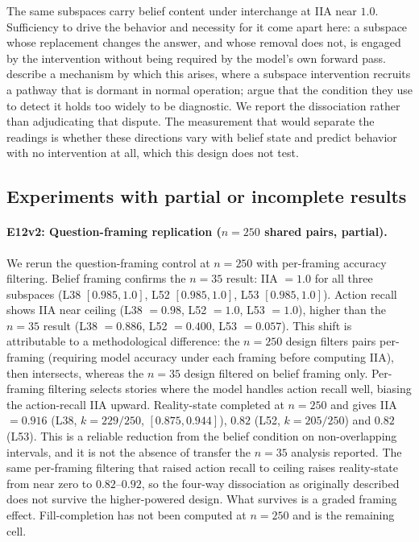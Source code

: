 \documentclass{article}
\begin{document}
The same subspaces carry belief content under interchange at IIA near $1.0$. Sufficiency to
drive the behavior and necessity for it come apart here: a subspace whose replacement changes
the answer, and whose removal does not, is engaged by the intervention without being required
by the model's own forward pass. \citet{makelov2024illusion} describe a mechanism by which
this arises, where a subspace intervention recruits a pathway that is dormant in normal
operation; \citet{wu2024replyillusion} argue that the condition they use to detect it holds
too widely to be diagnostic. We report the dissociation rather than adjudicating that
dispute. The measurement that would separate the readings is whether these directions vary
with belief state and predict behavior with no intervention at all, which this design does
not test.

\subsection{Experiments with partial or incomplete results}

\paragraph{E12v2: Question-framing replication ($n = 250$ shared pairs, partial).}
We rerun the question-framing control at $n = 250$ with per-framing accuracy filtering. Belief framing confirms the $n = 35$ result: IIA $= 1.0$ for all three subspaces (L38 $[0.985, 1.0]$, L52 $[0.985, 1.0]$, L53 $[0.985, 1.0]$). Action recall shows IIA near ceiling (L38 $= 0.98$, L52 $= 1.0$, L53 $= 1.0$), higher than the $n = 35$ result (L38 $= 0.886$, L52 $= 0.400$, L53 $= 0.057$). This shift is attributable to a methodological difference: the $n = 250$ design filters pairs per-framing (requiring model accuracy under each framing before computing IIA), then intersects, whereas the $n = 35$ design filtered on belief framing only. Per-framing filtering selects stories where the model handles action recall well, biasing the action-recall IIA upward. Reality-state completed at $n = 250$ and gives IIA $= 0.916$ (L38, $k = 229/250$, $[0.875, 0.944]$), $0.82$ (L52, $k = 205/250$) and $0.82$ (L53). This is a reliable reduction from the belief condition on non-overlapping intervals, and it is not the absence of transfer the $n = 35$ analysis reported. The same per-framing filtering that raised action recall to ceiling raises reality-state from near zero to $0.82$--$0.92$, so the four-way dissociation as originally described does not survive the higher-powered design. What survives is a graded framing effect. Fill-completion has not been computed at $n = 250$ and is the remaining cell.
\end{document}
